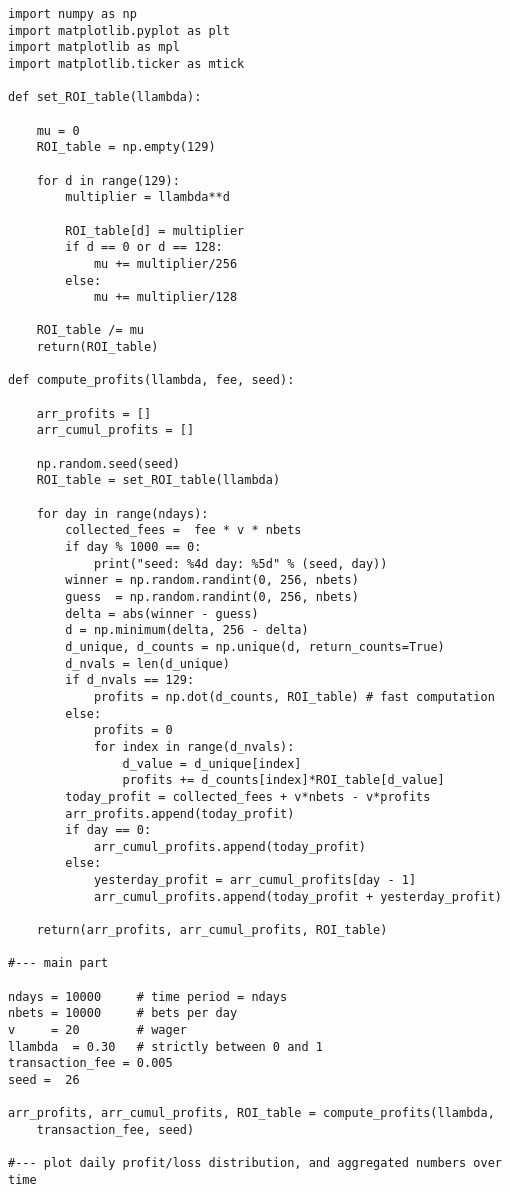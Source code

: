 \documentclass[oneside,10pt]{book}
\begin{document}
\begin{lstlisting}
import numpy as np
import matplotlib.pyplot as plt
import matplotlib as mpl
import matplotlib.ticker as mtick

def set_ROI_table(llambda):

    mu = 0
    ROI_table = np.empty(129)

    for d in range(129):
        multiplier = llambda**d

        ROI_table[d] = multiplier
        if d == 0 or d == 128:
            mu += multiplier/256
        else:
            mu += multiplier/128

    ROI_table /= mu
    return(ROI_table)

def compute_profits(llambda, fee, seed):

    arr_profits = []
    arr_cumul_profits = []

    np.random.seed(seed)
    ROI_table = set_ROI_table(llambda)

    for day in range(ndays):
        collected_fees =  fee * v * nbets
        if day % 1000 == 0:
            print("seed: %4d day: %5d" % (seed, day))
        winner = np.random.randint(0, 256, nbets)
        guess  = np.random.randint(0, 256, nbets)
        delta = abs(winner - guess)
        d = np.minimum(delta, 256 - delta)
        d_unique, d_counts = np.unique(d, return_counts=True)
        d_nvals = len(d_unique)
        if d_nvals == 129:
            profits = np.dot(d_counts, ROI_table) # fast computation
        else:
            profits = 0
            for index in range(d_nvals):
                d_value = d_unique[index]
                profits += d_counts[index]*ROI_table[d_value]
        today_profit = collected_fees + v*nbets - v*profits
        arr_profits.append(today_profit)
        if day == 0:
            arr_cumul_profits.append(today_profit)
        else:
            yesterday_profit = arr_cumul_profits[day - 1]
            arr_cumul_profits.append(today_profit + yesterday_profit)

    return(arr_profits, arr_cumul_profits, ROI_table)

#--- main part

ndays = 10000     # time period = ndays
nbets = 10000     # bets per day
v     = 20        # wager
llambda  = 0.30   # strictly between 0 and 1
transaction_fee = 0.005
seed =  26

arr_profits, arr_cumul_profits, ROI_table = compute_profits(llambda,
    transaction_fee, seed)

#--- plot daily profit/loss distribution, and aggregated numbers over time


\end{lstlisting}
\end{document}

